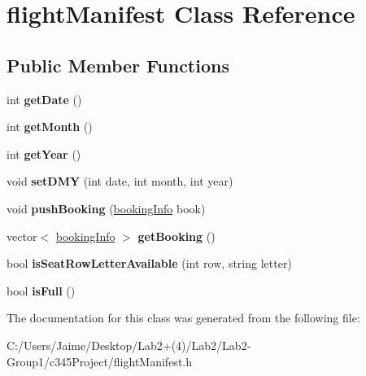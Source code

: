 \hypertarget{classflight_manifest}{
\section{flightManifest Class Reference}
\label{classflight_manifest}
}
\subsection*{Public Member Functions}
\begin{DoxyCompactItemize}
\item 
\hypertarget{classflight_manifest_a34a8800b5872bf61f3af933b5b844713}{
int {\bfseries getDate} ()}
\label{classflight_manifest_a34a8800b5872bf61f3af933b5b844713}

\item 
\hypertarget{classflight_manifest_a04e3a3f1801bc1d63d435384882191fa}{
int {\bfseries getMonth} ()}
\label{classflight_manifest_a04e3a3f1801bc1d63d435384882191fa}

\item 
\hypertarget{classflight_manifest_a9035060ab31db8391160943ea88ce160}{
int {\bfseries getYear} ()}
\label{classflight_manifest_a9035060ab31db8391160943ea88ce160}

\item 
\hypertarget{classflight_manifest_a6e3384d25f196ac84d903fd57cdf9946}{
void {\bfseries setDMY} (int date, int month, int year)}
\label{classflight_manifest_a6e3384d25f196ac84d903fd57cdf9946}

\item 
\hypertarget{classflight_manifest_aff4f54fe1006f8d6a30a90c3cb07f7c3}{
void {\bfseries pushBooking} (\hyperlink{classbooking_info}{bookingInfo} book)}
\label{classflight_manifest_aff4f54fe1006f8d6a30a90c3cb07f7c3}

\item 
\hypertarget{classflight_manifest_aeb54869e9e0b2a25041a509ccb065d9f}{
vector$<$ \hyperlink{classbooking_info}{bookingInfo} $>$ {\bfseries getBooking} ()}
\label{classflight_manifest_aeb54869e9e0b2a25041a509ccb065d9f}

\item 
\hypertarget{classflight_manifest_ad15ca80fa37f1cfc2035f3324c548256}{
bool {\bfseries isSeatRowLetterAvailable} (int row, string letter)}
\label{classflight_manifest_ad15ca80fa37f1cfc2035f3324c548256}

\item 
\hypertarget{classflight_manifest_aa5767078f637cf762151ae0e0d2f7bd7}{
bool {\bfseries isFull} ()}
\label{classflight_manifest_aa5767078f637cf762151ae0e0d2f7bd7}

\end{DoxyCompactItemize}


The documentation for this class was generated from the following file:\begin{DoxyCompactItemize}
\item 
C:/Users/Jaime/Desktop/Lab2+(4)/Lab2/Lab2-\/Group1/c345Project/flightManifest.h\end{DoxyCompactItemize}
